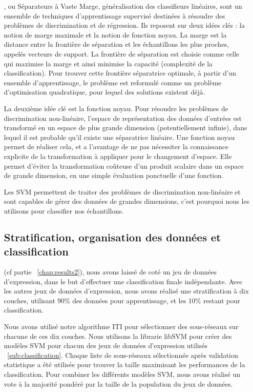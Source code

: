 			, ou Séparateurs à Vaste Marge, généralisation des classifieurs linéaires, sont un ensemble de techniques d'apprentissage supervisé destinées à résoudre des problèmes de discrimination et de régression.
			Ils reposent sur deux idées clés : la notion de marge maximale et la notion de fonction noyau.
			La marge est la distance entre la frontière de séparation et les échantillons les plus proches, appelés vecteurs de support.
			La frontière de séparation est choisie comme celle qui maximise la marge et ainsi minimise la capacité (complexité de la classification).
			Pour trouver cette frontière séparatrice optimale, à partir d'un ensemble d'apprentissage, le problème est reformulé comme un problème d'optimisation quadratique, pour lequel des solutions existent déjà.

			La deuxième idée clé est la fonction noyau.
			Pour résoudre les problèmes de discrimination non-linéaire, l'espace de représentation des données d'entrées est transformé en un espace de plus grande dimension (potentiellement infinie), dans lequel il est probable qu'il existe une séparatrice linéaire.
			Une fonction noyau permet de réaliser cela, et a l'avantage de ne pas nécessiter la connaissance explicite de la transformation à appliquer pour le changement d'espace.
			Elle permet d'éviter la transformation coûteuse d'un produit scalaire dans un espace de grande dimension, en une simple évaluation ponctuelle d'une fonction.

			Les \ac{SVM} permettent de traiter des problèmes de discrimination non-linéaire et sont capables de gérer des données de grandes dimensions, c'est pourquoi nous les utilisons pour classifier nos échantillons.

		\subsection{\textcolor{green!45!black}{Stratification, organisation des données et classification}}
			 (cf partie ~\ref{chap:results2}), nous avons laissé de coté un jeu de données d'expression, dans le but d'effectuer une classification finale indépendante.
			Avec les autres jeux de données d'expression, nous avons réalisé une stratification à dix couches, utilisant 90\% des données pour apprentissage, et les 10\% restant pour classification.





			
			Nous avons utilisé notre algorithme ITI pour sélectionner des sous-réseaux sur chacune de ces dix couches.
			Nous utilisons la librarie libSVM pour créer des modèles \ac{SVM} pour chacun des jeux de données d'expression utilisés ~\ref{sub:classification}.
			Chaque liste de sous-réseaux sélectionnée après validation statistique a été utilisée pour trouver la taille maximisant les performances de la classification.
			Pour combiner les différents modèles \ac{SVM}, nous avons réalisé un vote à la majorité pondéré par la taille de la population du jeux de données.

